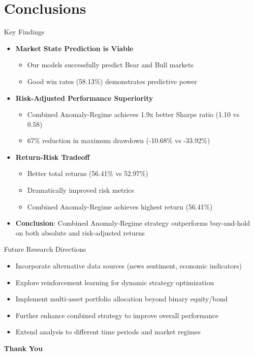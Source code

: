 \documentclass[aspectratio=169,xcolor=dvipsnames]{beamer}
\begin{document}
\section{Conclusions}
\begin{frame}{Key Findings}
	\begin{itemize}
		\item \textbf{Market State Prediction is Viable}
		      \begin{itemize}
			      \item Our models successfully predict Bear and Bull markets
			      \item Good win rates (58.13\%) demonstrates predictive power
		      \end{itemize}
		\item \textbf{Risk-Adjusted Performance Superiority}
		      \begin{itemize}
			      \item Combined Anomaly-Regime achieves 1.9x better Sharpe ratio (1.10 vs 0.58)
			      \item 67\% reduction in maximum drawdown (-10.68\% vs -33.92\%)
		      \end{itemize}
		\item \textbf{Return-Risk Tradeoff}
		      \begin{itemize}
			      \item Better total returns (56.41\% vs 52.97\%)
			      \item Dramatically improved risk metrics
			      \item Combined Anomaly-Regime achieves highest return (56.41\%)
		      \end{itemize}
		\item \textbf{Conclusion}: Combined Anomaly-Regime strategy outperforms buy-and-hold on both absolute and risk-adjusted returns
	\end{itemize}
\end{frame}

\begin{frame}{Future Research Directions}
	\begin{itemize}
		\item Incorporate alternative data sources (news sentiment, economic indicators)
		\item Explore reinforcement learning for dynamic strategy optimization
		\item Implement multi-asset portfolio allocation beyond binary equity/bond
		\item Further enhance combined strategy to improve overall performance
		\item Extend analysis to different time periods and market regimes
	\end{itemize}
\end{frame}

\begin{frame}
	\Huge{\centerline{\textbf{Thank You}}}
\end{frame}

\end{document}
